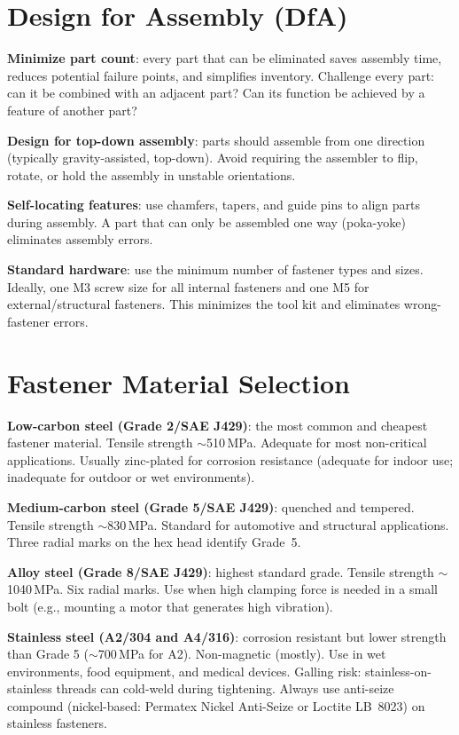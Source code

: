\section{Design for Assembly (DfA)}
\textbf{Minimize part count}: every part that can be eliminated saves assembly time, reduces potential failure points, and simplifies inventory. Challenge every part: can it be combined with an adjacent part? Can its function be achieved by a feature of another part?

\textbf{Design for top-down assembly}: parts should assemble from one direction (typically gravity-assisted, top-down). Avoid requiring the assembler to flip, rotate, or hold the assembly in unstable orientations.

\textbf{Self-locating features}: use chamfers, tapers, and guide pins to align parts during assembly. A part that can only be assembled one way (poka-yoke) eliminates assembly errors.

\textbf{Standard hardware}: use the minimum number of fastener types and sizes. Ideally, one M3 screw size for all internal fasteners and one M5 for external/structural fasteners. This minimizes the tool kit and eliminates wrong-fastener errors.
\section{Fastener Material Selection}
\textbf{Low-carbon steel (Grade 2/SAE J429)}: the most common and cheapest fastener material. Tensile strength $\sim$510\,MPa. Adequate for most non-critical applications. Usually zinc-plated for corrosion resistance (adequate for indoor use; inadequate for outdoor or wet environments).

\textbf{Medium-carbon steel (Grade 5/SAE J429)}: quenched and tempered. Tensile strength $\sim$830\,MPa. Standard for automotive and structural applications. Three radial marks on the hex head identify Grade~5.

\textbf{Alloy steel (Grade 8/SAE J429)}: highest standard grade. Tensile strength $\sim$1040\,MPa. Six radial marks. Use when high clamping force is needed in a small bolt (e.g., mounting a motor that generates high vibration).

\textbf{Stainless steel (A2/304 and A4/316)}: corrosion resistant but lower strength than Grade 5 ($\sim$700\,MPa for A2). Non-magnetic (mostly). Use in wet environments, food equipment, and medical devices. Galling risk: stainless-on-stainless threads can cold-weld during tightening. Always use anti-seize compound (nickel-based: Permatex Nickel Anti-Seize or Loctite LB~8023) on stainless fasteners.

